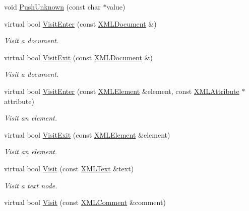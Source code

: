\begin{DoxyCompactItemize}
\item 
void \hyperlink{classtinyxml2_1_1_x_m_l_printer_ab1efc6d1548505e9984185f58f54b713}{Push\+Unknown} (const char $\ast$value)
\item 
virtual bool \hyperlink{classtinyxml2_1_1_x_m_l_printer_a9aa1de11a55a07db55a90fde37d7afad}{Visit\+Enter} (const \hyperlink{classtinyxml2_1_1_x_m_l_document}{X\+M\+L\+Document} \&)
\begin{DoxyCompactList}\small\item\em Visit a document. \end{DoxyCompactList}\item 
virtual bool \hyperlink{classtinyxml2_1_1_x_m_l_printer_a15fc1f2b922f540917dcf52808737b29}{Visit\+Exit} (const \hyperlink{classtinyxml2_1_1_x_m_l_document}{X\+M\+L\+Document} \&)
\begin{DoxyCompactList}\small\item\em Visit a document. \end{DoxyCompactList}\item 
virtual bool \hyperlink{classtinyxml2_1_1_x_m_l_printer_a169b2509d8eabb70811b2bb8cfd1f5d1}{Visit\+Enter} (const \hyperlink{classtinyxml2_1_1_x_m_l_element}{X\+M\+L\+Element} \&element, const \hyperlink{classtinyxml2_1_1_x_m_l_attribute}{X\+M\+L\+Attribute} $\ast$attribute)
\begin{DoxyCompactList}\small\item\em Visit an element. \end{DoxyCompactList}\item 
virtual bool \hyperlink{classtinyxml2_1_1_x_m_l_printer_a2edd48405971a88951c71c9df86a2f50}{Visit\+Exit} (const \hyperlink{classtinyxml2_1_1_x_m_l_element}{X\+M\+L\+Element} \&element)
\begin{DoxyCompactList}\small\item\em Visit an element. \end{DoxyCompactList}\item 
virtual bool \hyperlink{classtinyxml2_1_1_x_m_l_printer_adc0e42b4f6fcb90a95630c79575d030b}{Visit} (const \hyperlink{classtinyxml2_1_1_x_m_l_text}{X\+M\+L\+Text} \&text)
\begin{DoxyCompactList}\small\item\em Visit a text node. \end{DoxyCompactList}\item 
virtual bool \hyperlink{classtinyxml2_1_1_x_m_l_printer_aa294c5c01af0ebb9114902456e4cb53c}{Visit} (const \hyperlink{classtinyxml2_1_1_x_m_l_comment}{X\+M\+L\+Comment} \&comment)

\end{DoxyCompactItemize}
